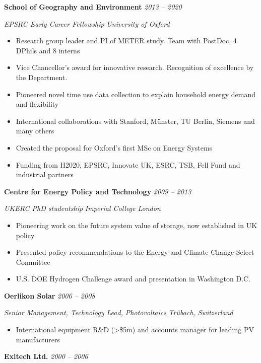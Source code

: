 \documentclass[11pt]{article}
\providecommand{\tightlist}{%
    \setlength{\itemindent}{0em}
    \setlength{\itemsep}{1em}
    \setlength{\parskip}{-.8em}
    }
\begin{document}
\textbf{School of Geography and Environment} \hfill   \emph{2013 --
2020}

\emph{EPSRC Early Career Fellowship} \hfill  \emph{University of Oxford}

\begin{itemize}
\tightlist
\item
  Research group leader and PI of METER study. Team with PostDoc, 4
  DPhils and 8 interns
\item
  Vice Chancellor's award for innovative research. Recognition of
  excellence by the Department.
\item
  Pioneered novel time use data collection to explain household energy
  demand and flexibility
\item
  International collaborations with Stanford, Münster, TU Berlin,
  Siemens and many others
\item
  Created the proposal for Oxford's first MSc on Energy Systems
\item
  Funding from H2020, EPSRC, Innovate UK, ESRC, TSB, Fell Fund and
  industrial partners
\end{itemize}

\textbf{Centre for Energy Policy and Technology} \hfill   \emph{2009 --
2013}

\emph{UKERC PhD studentship} \hfill  \emph{Imperial College London}

\begin{itemize}
\tightlist
\item
  Pioneering work on the future system value of storage, now established
  in UK policy
\item
  Presented policy recommendations to the Energy and Climate Change
  Select Committee
\item
  U.S. DOE Hydrogen Challenge award and presentation in Washington D.C.
\end{itemize}

\textbf{Oerlikon Solar} \hfill   \emph{2006 -- 2008}

\emph{Senior Management, Technology Lead, Photovoltaics}
\hfill  \emph{Trübach, Switzerland}

\begin{itemize}
\tightlist
\item
  International equipment R\&D (\textgreater\$5m) and accounts manager
  for leading PV manufacturers
\end{itemize}

\textbf{Exitech Ltd.} \hfill   \emph{2000 -- 2006}
\end{document}
